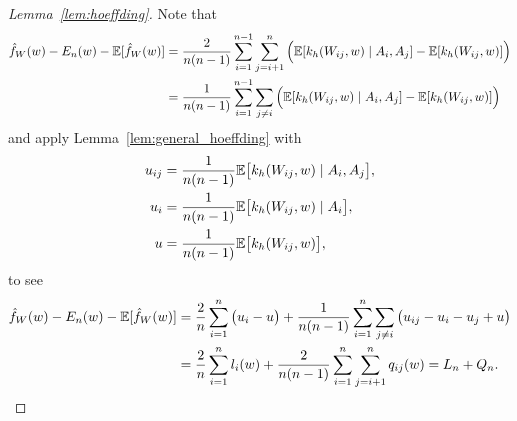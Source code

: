 \begin{proof}[Lemma~\ref{lem:hoeffding}]


  Note that
  \begin{align*}
    \hat f_W(w)
    - E_n(w)
    - \mathbb{E}[\hat f_W(w)]
    &=
    \frac{2}{n(n-1)}
    \sum_{i=1}^{n-1}
    \sum_{j=i+1}^{n}
    \Big(
      \mathbb{E}[k_h(W_{i j},w) \mid A_i, A_j]
      - \mathbb{E}[k_h(W_{i j},w)]
    \Big) \\
    &=
    \frac{1}{n(n-1)}
    \sum_{i=1}^{n-1}
    \sum_{j \neq i}
    \Big(
      \mathbb{E}[k_h(W_{i j},w) \mid A_i, A_j]
      - \mathbb{E}[k_h(W_{i j},w)]
    \Big)
  \end{align*}
  and apply Lemma~\ref{lem:general_hoeffding}
  with
  \begin{align*}
    u_{i j}
    &=
    \frac{1}{n(n-1)}
    \mathbb{E}\big[k_h(W_{i j},w) \mid A_i, A_j\big], \\
    u_i
    &=
    \frac{1}{n(n-1)}
    \mathbb{E}\big[k_h(W_{i j},w) \mid A_i\big], \\
    u
    &=
    \frac{1}{n(n-1)}
    \mathbb{E}\big[k_h(W_{i j},w)\big],
  \end{align*}
  to see
  \begin{align*}
    \hat f_W(w)
    - E_n(w)
    - \mathbb{E}[\hat f_W(w)]
    &=
    \frac{2}{n}
    \sum_{i=1}^n
    \big(u_i - u\big)
    + \frac{1}{n(n-1)}
    \sum_{i=1}^n
    \sum_{j \neq i}
    \big(
      u_{i j} - u_i - u_j + u
    \big) \\
    &=
    \frac{2}{n}
    \sum_{i=1}^n
    l_i(w)
    + \frac{2}{n(n-1)}
    \sum_{i=1}^n
    \sum_{j = i+1}^n
    q_{i j}(w)
    =
    L_n + Q_n.
  \end{align*}



\end{proof}
